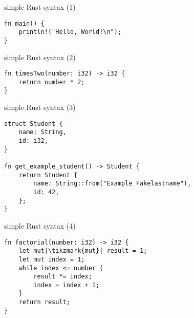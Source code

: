 \usetikzlibrary{positioning,shapes.callouts}
\begin{frame}[fragile,label=rustHelloWorld1]{simple Rust syntax (1)}
\begin{verbatim}
fn main() {
    println!("Hello, World!\n");
}
\end{verbatim}
\end{frame}

\begin{frame}[fragile,label=rustHelloWorld2]{simple Rust syntax (2)}
\begin{verbatim}
fn timesTwo(number: i32) -> i32 {
    return number * 2;
}
\end{verbatim}
\end{frame}

\begin{frame}[fragile,label=rustHelloWorld3]{simple Rust syntax (3)}
    \begin{verbatim}
struct Student {
    name: String,
    id: i32,
}

fn get_example_student() -> Student {
    return Student {
        name: String::from("Example Fakelastname"),
        id: 42,
    };
}
\end{verbatim}
\end{frame}

\begin{frame}[fragile,label=rustHelloWorld4]{simple Rust syntax (4)}
    \begin{verbatim}
fn factorial(number: i32) -> i32 {
    let mut|\tikzmark{mut}| result = 1;
    let mut index = 1;
    while index <= number {
        result *= index;
        index = index + 1;
    }
    return result;
}
\end{verbatim}
\end{frame}

